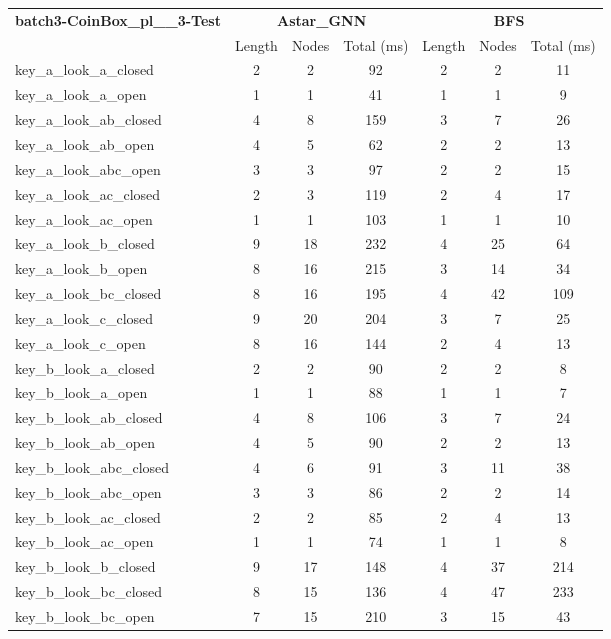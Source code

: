 \begin{table}[!ht]
\centering
\small
\begin{tabular}{l|ccc|ccc}
\multirow{2}{*}{\textbf{batch3-CoinBox\_pl\_\_3-Test}} & \multicolumn{3}{c|}{\textbf{Astar\_GNN}} & \multicolumn{3}{c}{\textbf{BFS}} \\
\cline{2-7}
& Length & Nodes & Total (ms) & Length & Nodes & Total (ms) \\
\hline
key\_a\_look\_a\_closed & 2 & 2 & 92 & 2 & 2 & 11 \\
key\_a\_look\_a\_open & 1 & 1 & 41 & 1 & 1 & 9 \\
key\_a\_look\_ab\_closed & 4 & 8 & 159 & 3 & 7 & 26 \\
key\_a\_look\_ab\_open & 4 & 5 & 62 & 2 & 2 & 13 \\
key\_a\_look\_abc\_open & 3 & 3 & 97 & 2 & 2 & 15 \\
key\_a\_look\_ac\_closed & 2 & 3 & 119 & 2 & 4 & 17 \\
key\_a\_look\_ac\_open & 1 & 1 & 103 & 1 & 1 & 10 \\
key\_a\_look\_b\_closed & 9 & 18 & 232 & 4 & 25 & 64 \\
key\_a\_look\_b\_open & 8 & 16 & 215 & 3 & 14 & 34 \\
key\_a\_look\_bc\_closed & 8 & 16 & 195 & 4 & 42 & 109 \\
key\_a\_look\_c\_closed & 9 & 20 & 204 & 3 & 7 & 25 \\
key\_a\_look\_c\_open & 8 & 16 & 144 & 2 & 4 & 13 \\
key\_b\_look\_a\_closed & 2 & 2 & 90 & 2 & 2 & 8 \\
key\_b\_look\_a\_open & 1 & 1 & 88 & 1 & 1 & 7 \\
key\_b\_look\_ab\_closed & 4 & 8 & 106 & 3 & 7 & 24 \\
key\_b\_look\_ab\_open & 4 & 5 & 90 & 2 & 2 & 13 \\
key\_b\_look\_abc\_closed & 4 & 6 & 91 & 3 & 11 & 38 \\
key\_b\_look\_abc\_open & 3 & 3 & 86 & 2 & 2 & 14 \\
key\_b\_look\_ac\_closed & 2 & 2 & 85 & 2 & 4 & 13 \\
key\_b\_look\_ac\_open & 1 & 1 & 74 & 1 & 1 & 8 \\
key\_b\_look\_b\_closed & 9 & 17 & 148 & 4 & 37 & 214 \\
key\_b\_look\_bc\_closed & 8 & 15 & 136 & 4 & 47 & 233 \\
key\_b\_look\_bc\_open & 7 & 15 & 210 & 3 & 15 & 43 \\

\end{tabular}
\end{table}
